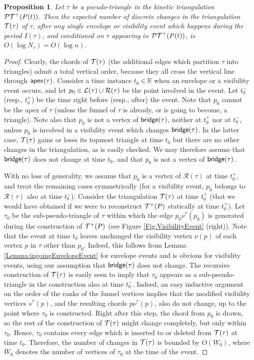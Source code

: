 \documentclass[11pt]{article}
\def\bridge{{\sf bridge}}
\def\PT{{\cal PT}}
\def\T{{\cal T}}
\def\reals{{\mathbb R}}
\def\L{{\cal L}}
\def\R{\mathcal{R}}
\def\apex{{\sf apex}}
\newtheorem{proposition}[theorem]{Proposition}
\begin{document}
\begin{proposition}\label{Thm:LogCostEvent}
  Let $\tau$ be a pseudo-triangle in the kinetic triangulation
  $\PT^+(P(t))$. Then the expected number of discrete
  changes in the triangulation $\T(\tau)$ of $\tau$, after any single
  envelope or visibility event which happens during the period $I(\tau)$, and conditioned on $\tau$ appearing in $\PT^+(P(t))$,
  is $O(\log N_\tau)=O(\log n)$.
\end{proposition}
\begin{proof}
  Clearly, the chords of $\T(\tau)$ (the additional edges which partition $\tau$ into triangles) admit a total vertical order, because
  they all cross the vertical line through $\apex(\tau)$.  Consider a
  time instance $t_0\in \reals$ when an envelope or a visibility event
  occurs, and let $p_0\in \L(\tau)\cup \R(\tau)$ be the point involved in
the event.
Let $t_0^-$ (resp., $t_0^+$) be the time right before (resp., after) the event. 
Note
  that $p_0$ cannot be the apex of $\tau$ (unless the funnel of $\tau$ is already, or is going to become, a triangle). Note also that $p_0$ is not
  a vertex of $\bridge(\tau)$, neither at $t_0^+$ nor at $t_0^-$, unless
  $p_0$ is involved in a visibility event which changes
  $\bridge(\tau)$. In the latter case, $\T(\tau)$ gains or loses
 its topmost triangle at
  time $t_0$ but there are no other changes in the triangulation, as is easily checked.
 We may therefore assume that
  $\bridge(\tau)$ does not change at time
  $t_0$, and that $p_0$ is not a vertex of $\bridge(\tau)$.

  With no loss of generality, we assume that $p_0$ is a vertex of
  $\R(\tau)$ at time $t_0^+$, and treat the remaining cases
  symmetrically (for a visibility event, $p_0$ belongs to $\R(\tau)$ also at time $t_0^-$).  Consider the triangulation $\T(\tau)$ at time
  $t_0^+$ (that we would have obtained if we were to reconstruct $\T^+(P)$ statically at time $t_0^+$).  Let $\tau_0$ be the sub-pseudo-triangle of $\tau$ within which
  the edge $p_0\nu^*(p_0)$ is generated during the construction of $\T^+(P)$ (see Figure
  \ref{Fig:VisibilityEvent} (right)).  
  Note that the event at time $t_0$ leaves unchanged the visibility vertex $\nu(p)$ of each vertex $p$ in $\tau$ other than $p_0$.
  Indeed, this follows from Lemma \ref{Lemma:ingoingEnvelopeEvent} for envelope events and is obvious for visibility events, using our assumption that $\bridge(\tau)$ does not change. The recursive construction of $\T(\tau)$ is easily seen to imply that $\tau_0$
  appears as a sub-pseudo-triangle in the construction also at time $t_0^-$. Indeed, an easy inductive argument on the order of the ranks of the funnel vertices implies that the modified visibility vertices $\nu^*(p)$, and the resulting chords $p\nu^*(p)$, also do not change, up to the point where $\tau_0$ is constructed. Right after this step, the chord from $p_0$ is drawn, so the rest of the construction of $\T(\tau)$ might change completely, but only within $\tau_0$. Hence, $\tau_0$ contains every edge which
  is inserted to or deleted from $\T(\tau)$ at time $t_0$.  Therefore,
  the number of changes in $\T(\tau)$ is bounded by $O(W_0)$, where
  $W_0$ denotes the number of vertices of $\tau_0$ at the time of the event.



\end{proof}
\end{document}
